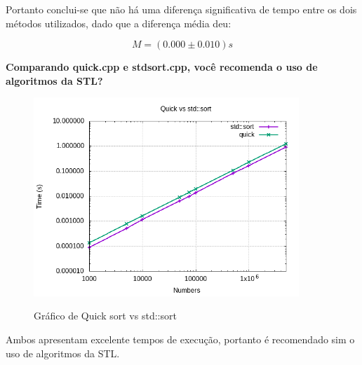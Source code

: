 \documentclass[a4paper, 12pt]{article}
\begin{document}
Portanto conclui-se que não há uma diferença significativa de tempo entre os dois métodos utilizados, dado que a diferença média deu:

\begin{equation*}
M = (0.000	\pm 0.010)s
\end{equation*}


\textbf{Comparando quick.cpp e stdsort.cpp, você recomenda o uso de algoritmos da STL?}

\begin{figure}[H]
	\centering
	\includegraphics[width=10.0cm]{quick_vs_stdsort.png}
	\caption{}{Gráfico de Quick sort vs std::sort}
	\label{fig:quick_vs_std}  
\end{figure}

\begin{table}[H] %
	\begin{center}
    	\end{center}
\end{table}


Ambos apresentam excelente tempos de execução, portanto é recomendado sim o uso de algoritmos da STL. 
\end{document}
